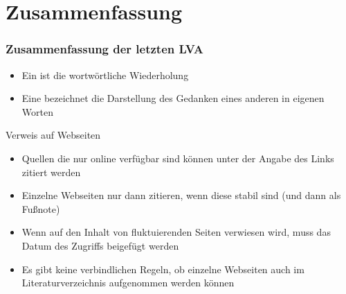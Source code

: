 
\section{Zusammenfassung}
\begin{frame}
\frametitle{Zusammenfassung der letzten LVA}  

\begin{Definition}
  \begin{itemize}
  \item<3-> Ein  ist die wortwörtliche Wiederholung
  \item<4-> Eine  bezeichnet die Darstellung des Gedanken eines 
    anderen in eigenen Worten
  \end{itemize}
\end{Definition}
\medskip
\begin{mybox}{Verweis auf Webseiten}
\begin{itemize}
\item<6-> Quellen die nur online verfügbar sind können unter der Angabe
des Links zitiert werden
\item<7-> Einzelne Webseiten nur dann zitieren, wenn diese stabil sind (und dann
als Fußnote)
\item<8-> Wenn auf den Inhalt von fluktuierenden Seiten verwiesen wird, muss
das Datum des  Zugriffs beigefügt werden
\item<9-> Es gibt keine verbindlichen Regeln, ob einzelne Webseiten auch im
Literaturverzeichnis aufgenommen werden können
\end{itemize}
\end{mybox}
\end{frame}

